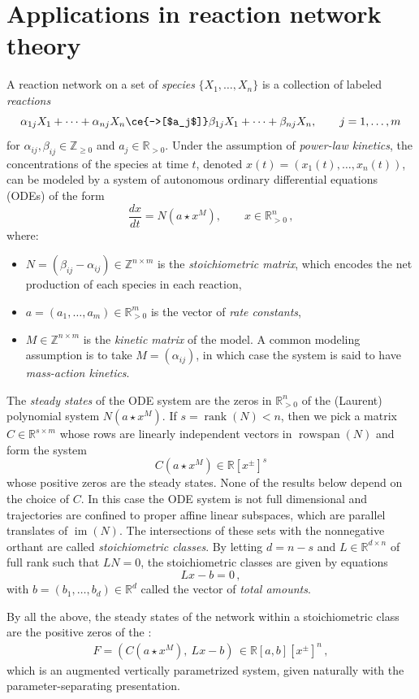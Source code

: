 \documentclass[11pt,reqno,a4paper]{amsart}
\numberwithin{equation}{section}
\theoremstyle{theoremstyle}
\theoremstyle{examplestyle}
\newcommand{\RR}{\mathbb{R}}
\newcommand{\ZZ}{\mathbb{Z}}
\DeclareMathOperator{\rank}{rank}
\DeclareMathOperator{\rowspan}{rowspan}
\DeclareMathOperator{\im}{im}
\newcommand{\term}{\bfemph}
\begin{document}
 
 
\section{Applications in reaction network theory}
\label{sec:reaction_networks}
A reaction network on a set of \emph{species} $\{X_1,\dots,X_n\}$ is a collection of labeled \emph{reactions}
\[\alpha_{1j}X_1+\dots+\alpha_{nj}X_n \ce{->[$a_j$]} \beta_{1j} X_1+\dots+\beta_{nj} X_n, \qquad j=1,\dots,m\]
for $\alpha_{ij},\beta_{ij}\in\ZZ_{\geq 0}$ and $a_j\in \RR_{>0}$. 
Under the assumption of \emph{power-law kinetics}, the concentrations of the species at time $t$, denoted $x(t)=(x_1(t),\dots,x_n(t))$, can be modeled by a system of autonomous ordinary differential equations (ODEs) of the form
\[ \frac{d x}{dt} = N (a \star x^M), \qquad  x \in \RR^n_{>0} \, ,\]
where:
\begin{itemize}
    \item $N = (\beta_{ij}-\alpha_{ij}) \in \ZZ^{n\times m}$ is the \emph{stoichiometric matrix}, which encodes the net production of each species in each reaction,
    \item $a=(a_1,\dots,a_m) \in \RR^m_{>0}$ is the vector of \emph{rate constants},
    \item $M\in \ZZ^{n\times m}$ is the \emph{kinetic matrix} of the model. A common modeling assumption is to take $M=(\alpha_{ij})$, in which case the system is said to have \emph{mass-action kinetics}. 
\end{itemize}

 
The \emph{steady states} of the ODE system  are the zeros in $\RR^n_{>0}$ of the (Laurent) polynomial system $N (a \star x^M)$. If $s=\rank(N)<n$, then 
we pick a matrix $C\in \RR^{s\times m}$ whose rows are linearly independent vectors in $\rowspan(N)$ and form the system
\[C (a \star x^M)  \in \RR[x^\pm]^s  \]
whose positive zeros are the steady states. 
None of the results below depend on the choice of $C$. In this case the ODE system is not full dimensional and trajectories are confined to proper affine linear subspaces, which are parallel translates of $\im(N)$. The intersections of these sets with the nonnegative orthant are called \emph{stoichiometric classes}. 
By letting $d=n-s$ and $L\in \RR^{d \times n}$ of full rank such that $L N =0$, the stoichiometric classes are given by equations
\[ L x - b =0 \, , \]
with $b=(b_1,\dots,b_d)\in \RR^{d}$ called the vector of \emph{total amounts}. 



By all the above, the  steady states of the network within a stoichiometric class are the positive zeros of the 
 \term{(parametric) steady state system}: 
 \begin{align}
    \label{eq:SteadyStateSystem}
  F=\left(C (a \star x^M),\: L x - b\right)\, \in \RR[a,b][x^\pm]^n\,,
    \end{align}
    which is an augmented vertically parametrized system, given naturally with the parameter-separating presentation. 
   
\end{document}

